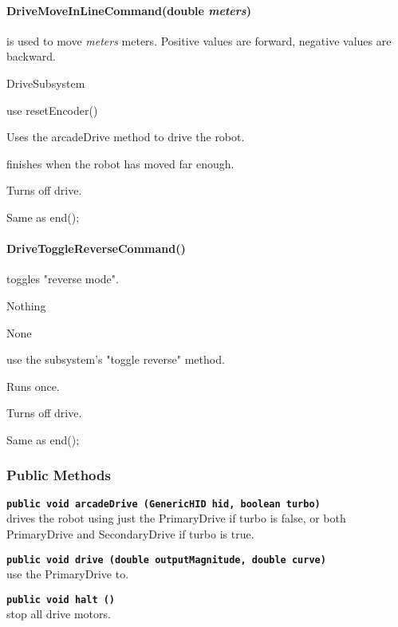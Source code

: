 \documentclass[]{article}
\begin{document}
\paragraph{DriveMoveInLineCommand(double \textit{meters})} is used to move \textit{meters} meters. Positive values are forward, negative values are backward.
\begin{description}[topsep=0ex]
\item[requires] DriveSubsystem
\item[initialization]  use resetEncoder()
\item[execute] Uses the arcadeDrive method to drive the robot.
\item[isDone] finishes when the robot has moved far enough.
\item[end] Turns off drive.
\item[interrupted] Same as end();
\end{description}

\paragraph{DriveToggleReverseCommand()} toggles "reverse mode".
\begin{description}[topsep=0ex]
\item[requires] Nothing
\item[initialization] None
\item[execute] use the subsystem's "toggle reverse" method.
\item[isDone] Runs once.
\item[end] Turns off drive.
\item[interrupted] Same as end();
\end{description}

\subsubsection{Public Methods}

\noindent \texttt{\textbf{public void arcadeDrive (GenericHID hid, boolean turbo)}} \\
drives the robot using just the PrimaryDrive if turbo is false, or
both PrimaryDrive and SecondaryDrive if turbo is true.

\noindent \texttt{\textbf{public void drive (double outputMagnitude, double curve)}} \\
use the PrimaryDrive to.

\noindent \texttt{\textbf{public void halt ()}} \\
stop all drive motors.
\end{document}
